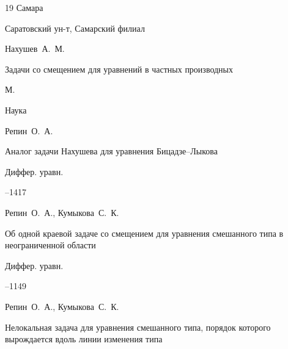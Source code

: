 \begin{thebibliography}{19}
\publaddr Самара

\publ Саратовский ун-т, Самарский филиал









\by Нахушев~А.~М.

\book Задачи со смещением для уравнений в частных производных

\publaddr М.

\publ Наука







\by Репин~О.~А.

\paper Аналог задачи Нахушева для уравнения Бицадзе--Лыкова

\jour Диффер. уравн.




–1417





\by Репин~О.~А., Кумыкова~С.~К.

\paper Об одной краевой задаче со смещением для уравнения смешанного типа в неограниченной области

\jour Диффер. уравн.




–1149  





\by Репин~О.~А., Кумыкова~С.~К.

\paper Нелокальная задача для уравнения смешанного типа, порядок которого вырождается вдоль линии изменения типа


\end{thebibliography}
